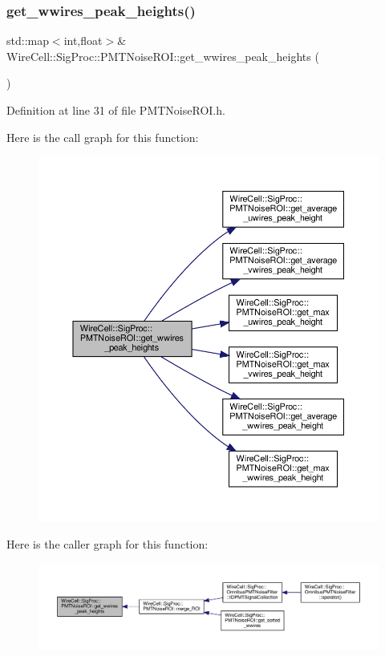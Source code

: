 \subsubsection{\texorpdfstring{get\+\_\+wwires\+\_\+peak\+\_\+heights()}{get\_wwires\_peak\_heights()}}
{\footnotesize\ttfamily std\+::map$<$int,float$>$\& Wire\+Cell\+::\+Sig\+Proc\+::\+P\+M\+T\+Noise\+R\+O\+I\+::get\+\_\+wwires\+\_\+peak\+\_\+heights (\begin{DoxyParamCaption}{ }\end{DoxyParamCaption})\hspace{0.3cm}{\ttfamily [inline]}}



Definition at line 31 of file P\+M\+T\+Noise\+R\+O\+I.\+h.

Here is the call graph for this function\+:
\nopagebreak
\begin{figure}[H]
\begin{center}
\leavevmode
\includegraphics[width=350pt]{class_wire_cell_1_1_sig_proc_1_1_p_m_t_noise_r_o_i_ac801578d1580a4d8eb0ba98b20f2191a_cgraph}
\end{center}
\end{figure}
Here is the caller graph for this function\+:
\nopagebreak
\begin{figure}[H]
\begin{center}
\leavevmode
\includegraphics[width=350pt]{class_wire_cell_1_1_sig_proc_1_1_p_m_t_noise_r_o_i_ac801578d1580a4d8eb0ba98b20f2191a_icgraph}
\end{center}
\end{figure}
